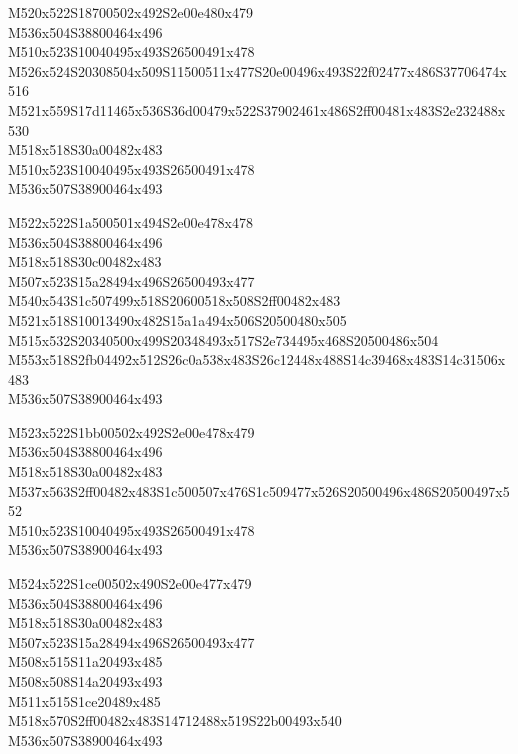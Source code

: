 \documentclass{article}
\begin{document}
\begin{multicols}{5}
\begin{center}

M520x522S18700502x492S2e00e480x479 %
\\M536x504S38800464x496 %
\\M510x523S10040495x493S26500491x478 %
\\M526x524S20308504x509S11500511x477S20e00496x493S22f02477x486S37706474x516 %
\\M521x559S17d11465x536S36d00479x522S37902461x486S2ff00481x483S2e232488x530 %
\\M518x518S30a00482x483 %
\\M510x523S10040495x493S26500491x478 %
\\M536x507S38900464x493 %
\vfil
\columnbreak

M522x522S1a500501x494S2e00e478x478 %
\\M536x504S38800464x496 %
\\M518x518S30c00482x483 %
\\M507x523S15a28494x496S26500493x477 %
\\M540x543S1c507499x518S20600518x508S2ff00482x483 %
\\M521x518S10013490x482S15a1a494x506S20500480x505 %
\\M515x532S20340500x499S20348493x517S2e734495x468S20500486x504 %
\\M553x518S2fb04492x512S26c0a538x483S26c12448x488S14c39468x483S14c31506x483 %
\\M536x507S38900464x493 %
\vfil
\columnbreak

M523x522S1bb00502x492S2e00e478x479 %
\\M536x504S38800464x496 %
\\M518x518S30a00482x483 %
\\M537x563S2ff00482x483S1c500507x476S1c509477x526S20500496x486S20500497x552 %
\\M510x523S10040495x493S26500491x478 %
\\M536x507S38900464x493 %
\vfil
\columnbreak

M524x522S1ce00502x490S2e00e477x479 %
\\M536x504S38800464x496 %
\\M518x518S30a00482x483 %
\\M507x523S15a28494x496S26500493x477 %
\\M508x515S11a20493x485 %
\\M508x508S14a20493x493 %
\\M511x515S1ce20489x485 %
\\M518x570S2ff00482x483S14712488x519S22b00493x540 %
\\M536x507S38900464x493 %
\vfil
\columnbreak


\end{center}
\end{multicols}
\end{document}
